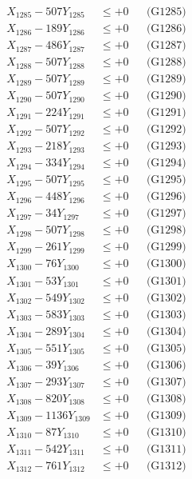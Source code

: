 \documentclass[a4paper,10pt]{article}
\begin{document}
{\begin{align}
X_{1285} - 507Y_{1285} &\leq +0 && \text{(G1285)} \\
X_{1286} - 189Y_{1286} &\leq +0 && \text{(G1286)} \\
X_{1287} - 486Y_{1287} &\leq +0 && \text{(G1287)} \\
X_{1288} - 507Y_{1288} &\leq +0 && \text{(G1288)} \\
X_{1289} - 507Y_{1289} &\leq +0 && \text{(G1289)} \\
X_{1290} - 507Y_{1290} &\leq +0 && \text{(G1290)} \\
\allowbreak
X_{1291} - 224Y_{1291} &\leq +0 && \text{(G1291)} \\
X_{1292} - 507Y_{1292} &\leq +0 && \text{(G1292)} \\
X_{1293} - 218Y_{1293} &\leq +0 && \text{(G1293)} \\
X_{1294} - 334Y_{1294} &\leq +0 && \text{(G1294)} \\
X_{1295} - 507Y_{1295} &\leq +0 && \text{(G1295)} \\
X_{1296} - 448Y_{1296} &\leq +0 && \text{(G1296)} \\
X_{1297} - 34Y_{1297} &\leq +0 && \text{(G1297)} \\
X_{1298} - 507Y_{1298} &\leq +0 && \text{(G1298)} \\
X_{1299} - 261Y_{1299} &\leq +0 && \text{(G1299)} \\
X_{1300} - 76Y_{1300} &\leq +0 && \text{(G1300)} \\
\allowbreak
X_{1301} - 53Y_{1301} &\leq +0 && \text{(G1301)} \\
X_{1302} - 549Y_{1302} &\leq +0 && \text{(G1302)} \\
X_{1303} - 583Y_{1303} &\leq +0 && \text{(G1303)} \\
X_{1304} - 289Y_{1304} &\leq +0 && \text{(G1304)} \\
X_{1305} - 551Y_{1305} &\leq +0 && \text{(G1305)} \\
X_{1306} - 39Y_{1306} &\leq +0 && \text{(G1306)} \\
X_{1307} - 293Y_{1307} &\leq +0 && \text{(G1307)} \\
X_{1308} - 820Y_{1308} &\leq +0 && \text{(G1308)} \\
X_{1309} - 1136Y_{1309} &\leq +0 && \text{(G1309)} \\
X_{1310} - 87Y_{1310} &\leq +0 && \text{(G1310)} \\
\allowbreak
X_{1311} - 542Y_{1311} &\leq +0 && \text{(G1311)} \\
X_{1312} - 761Y_{1312} &\leq +0 && \text{(G1312)} \\

\end{align}}
\end{document}
